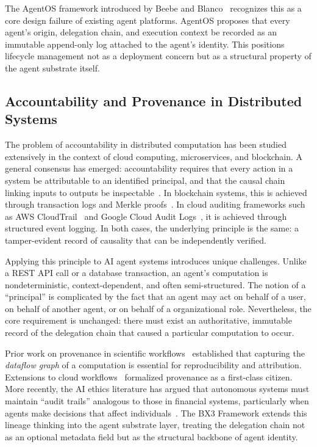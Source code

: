The AgentOS framework introduced by Beebe and Blanco~\cite{beebe2025agentos} recognizes this as a core design failure of existing agent platforms. AgentOS proposes that every agent's origin, delegation chain, and execution context be recorded as an immutable append-only log attached to the agent's identity. This positions lifecycle management not as a deployment concern but as a structural property of the agent substrate itself.

\subsection{Accountability and Provenance in Distributed Systems}

The problem of accountability in distributed computation has been studied extensively in the context of cloud computing, microservices, and blockchain. A general consensus has emerged: accountability requires that every action in a system be attributable to an identified principal, and that the causal chain linking inputs to outputs be inspectable~\cite{weitzner2008information,bates2015accountable}. In blockchain systems, this is achieved through transaction logs and Merkle proofs~\cite{nakamoto2008bitcoin}. In cloud auditing frameworks such as AWS CloudTrail~\cite{awscloudtrail} and Google Cloud Audit Logs~\cite{googleauditlogs}, it is achieved through structured event logging. In both cases, the underlying principle is the same: a tamper-evident record of causality that can be independently verified.

Applying this principle to AI agent systems introduces unique challenges. Unlike a REST API call or a database transaction, an agent's computation is nondeterministic, context-dependent, and often semi-structured. The notion of a ``principal'' is complicated by the fact that an agent may act on behalf of a user, on behalf of another agent, or on behalf of a organizational role. Nevertheless, the core requirement is unchanged: there must exist an authoritative, immutable record of the delegation chain that caused a particular computation to occur.

Prior work on provenance in scientific workflows~\cite{buneman2001 provenance,frew2008reproducible} established that capturing the \emph{dataflow graph} of a computation is essential for reproducibility and attribution. Extensions to cloud workflows~\cite{simmhan2005survey} formalized provenance as a first-class citizen. More recently, the AI ethics literature has argued that autonomous systems must maintain ``audit trails'' analogous to those in financial systems, particularly when agents make decisions that affect individuals~\cite{buvac2021artificial,brundage2020toward}. The BX3 Framework extends this lineage thinking into the agent substrate layer, treating the delegation chain not as an optional metadata field but as the structural backbone of agent identity.

